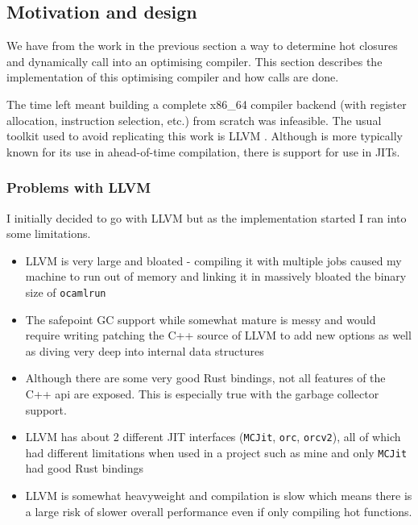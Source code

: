 \subsection{Motivation and design}

We have from the work in the previous section a way to determine hot closures and dynamically call
into an optimising compiler. This section describes the implementation of this optimising compiler
and how calls are done.

The time left meant building a complete x86\_64 compiler backend (with register allocation,
instruction selection, etc.) from scratch was infeasible. The usual toolkit used to avoid
replicating this work is LLVM \cite{llvm}. Although is more typically known for its use in
ahead-of-time compilation, there is support for use in JITs.

\subsubsection{Problems with LLVM}

I initially decided to go with LLVM but as the implementation started I ran into some limitations.

\begin{itemize}
      \item LLVM is very large and bloated - compiling it with multiple jobs caused my machine to
            run out of memory and linking it in massively bloated the binary size of
            \texttt{ocamlrun}
      \item The safepoint GC support while somewhat mature is messy and would require writing
            patching the C++ source of LLVM to add new options as well as diving very deep into
            internal data
            structures
      \item Although there are some very good Rust bindings, not all features of the C++ api are
            exposed. This is especially true with the garbage collector support.
      \item LLVM has about 2 different JIT interfaces (\texttt{MCJit}, \texttt{orc},
            \texttt{orcv2}),
            all of which had different limitations when used in a project such as mine and only
            \texttt{MCJit} had good Rust bindings
      \item LLVM is somewhat heavyweight and compilation is slow which means there is a large risk
            of slower overall performance even if only compiling hot functions.
\end{itemize}

